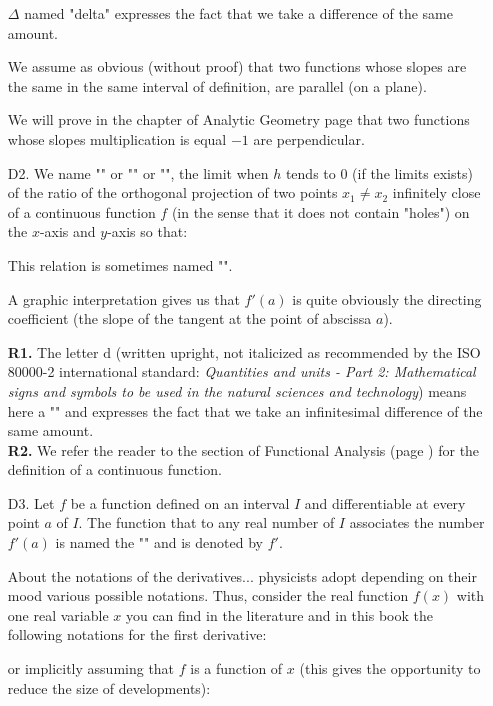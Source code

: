 \begin{enumerate}
	\begin{tcolorbox}[title=Remark,colframe=black,arc=10pt]
$\Delta$ named "delta" expresses the fact that we take a difference of the same amount.
	\end{tcolorbox}
We assume as obvious (without proof) that two functions whose slopes are the same in the same interval of definition, are parallel (on a plane).
	\begin{tcolorbox}[title=Remark,colframe=black,arc=10pt]
We will prove in the chapter of Analytic Geometry page \pageref{equation of the straight line} that two functions whose slopes multiplication is equal $-1$ are perpendicular.
	\end{tcolorbox}
	\item[D2.] We name "" or "" or "", the limit when $h$ tends to $0$ (if the limits exists) of the ratio of the orthogonal projection of two points $x_1\neq x_2$ infinitely close  of a continuous function $f$ (in the sense that it does not contain "holes") on the $x$-axis and $y$-axis so that:
	
	This relation is sometimes named "".
	
	A graphic interpretation gives us that $f'(a)$ is quite obviously the directing coefficient (the slope of the tangent at the point of abscissa $a$).
	
	\begin{tcolorbox}[title=Remarks,colframe=black,arc=10pt]
	\textbf{R1.} The letter $\mathrm{d}$ (written upright, not italicized as recommended by the ISO 80000-2 international standard: \textit{Quantities and units - Part 2: Mathematical signs and symbols to be used in the natural sciences and technology}) means here a "" and expresses the fact that we take an infinitesimal difference of the same amount.\\

	\textbf{R2.} We refer the reader to the section of Functional Analysis (page \pageref{limits}) for the definition of a continuous function.
	\end{tcolorbox}
	
	\item[D3.] Let $f$ be a function defined on an interval $I$ and differentiable at every point $a$ of $I$. The function that to any real number of $I$ associates the number $f'(a)$ is named the "" and is denoted by $f'$.
	\begin{tcolorbox}[title=Remark,colframe=black,arc=10pt]
	About the notations of the derivatives... physicists adopt depending on their mood various possible notations. Thus, consider the real function $f(x)$  with one real variable $x$ you can find in the literature and in this book the following notations for the first derivative:
	
	or implicitly assuming that $f$ is a function of $x$ (this gives the opportunity to reduce the size of developments):
	
	\end{tcolorbox}
\end{enumerate}
